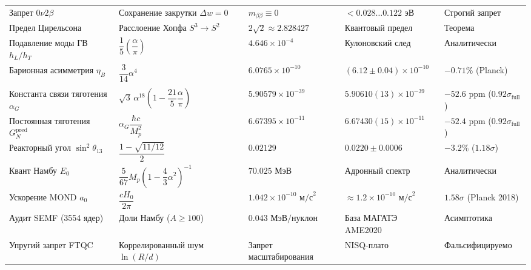 \documentclass[11pt,a4paper]{article}
\theoremstyle{definition}
\theoremstyle{remark}
\begin{document}
\begin{xltabular}{\textwidth}{
>{\raggedright\arraybackslash}p{3.8cm}
>{\centering\arraybackslash}X
>{\centering\arraybackslash}p{2.7cm}
>{\centering\arraybackslash}p{2.8cm}
>{\centering\arraybackslash}p{2.0cm}
}
Запрет $0\nu 2\beta$ & Сохранение закрутки $\Delta w = 0$ & $m_{\beta\beta} \equiv 0$ & $< 0.028\dots 0.122\text{ эВ}$ & Строгий запрет \\

Предел Цирельсона & Расслоение Хопфа $S^3 \to S^2$ & $2\sqrt{2} \approx 2.828427$ & Квантовый предел & Теорема \\

Подавление моды ГВ $h_L/h_T$ & $\dfrac{1}{5}\left(\dfrac{\alpha}{\pi}\right)$ & $4.646 \times 10^{-4}$ & Кулоновский след & Аналитически \\

Барионная асимметрия $\eta_B$ & $\dfrac{3}{14}\alpha^4$ & $6.0765 \times 10^{-10}$ & $(6.12 \pm 0.04)\times 10^{-10}$ & $-0.71\%$ (Planck) \\

 \\
\midrule

Константа связи тяготения $\alpha_G$ & $\sqrt{3}\,\alpha^{18}\left(1 - \dfrac{21}{5}\dfrac{\alpha}{\pi}\right)$ & $5.90579 \times 10^{-39}$ & $5.90610(13)\times 10^{-39}$ & $-52.6\text{ ppm}$ ($0.92\sigma_{\mathrm{full}}$) \\

Постоянная тяготения $G_N^{\mathrm{pred}}$ & $\alpha_G \dfrac{\hbar c}{M_p^2}$ & $6.67395 \times 10^{-11}$ & $6.67430(15)\times 10^{-11}$ & $-52.4\text{ ppm}$ ($0.92\sigma_{\mathrm{full}}$) \\

Реакторный угол $\sin^2\theta_{13}$ & $\dfrac{1 - \sqrt{11/12}}{2}$ & $0.02129$ & $0.0220 \pm 0.0006$ & $-3.2\%$ ($1.18\sigma$) \\

Квант Намбу $E_0$ & $\dfrac{5}{67} M_p \left(1 - \dfrac{4}{3}\alpha^2\right)^{-1}$ & $70.025\text{ МэВ}$ & Адронный спектр & Аналитически \\

Ускорение MOND $a_0$ & $\dfrac{c H_0}{2\pi}$ & $1.042 \times 10^{-10}\text{ м/с}^2$ & $\approx 1.2 \times 10^{-10}\text{ м/с}^2$ & $1.58\sigma$ (Planck 2018) \\

Аудит SEMF (3554 ядер) & Доли Намбу ($A \ge 100$) & $0.043\text{ МэВ/нуклон}$ & База МАГАТЭ AME2020 & Асимптотика \\

Упругий запрет FTQC & Коррелированный шум $\ln(R/d)$ & Запрет масштабирования & NISQ-плато & Фальсифицируемо \\

\end{xltabular}
\endgroup
\end{document}
